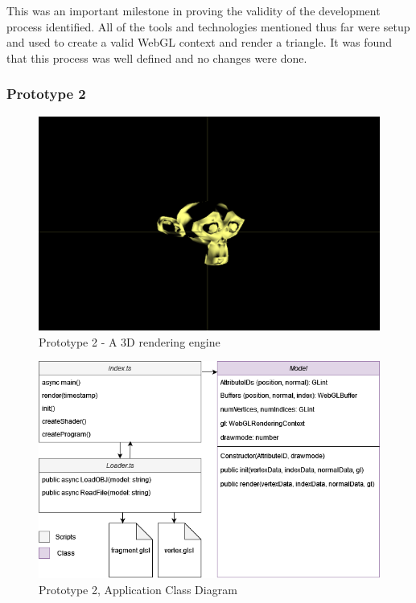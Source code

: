 This was an important milestone in proving the validity of the development process identified. All of the tools and technologies mentioned thus far were setup and used to create a valid WebGL context and render a triangle. It was found that this process was well defined and no changes were done.

\subsubsection {Prototype 2}
\begin{figure}[h]
    \centering
    \includegraphics[width=1\columnwidth]{author-files/figures/Monkey-Test2.png}
    \caption{Prototype 2 - A 3D rendering engine}
    \label{fig:Monkey}
\end{figure}

\begin{figure}
    \centering
    \includegraphics[width=1\columnwidth]{author-files/figures/proto2.png}
    \caption{Prototype 2, Application Class Diagram}
    \label{fig:proto2class}
\end{figure}

